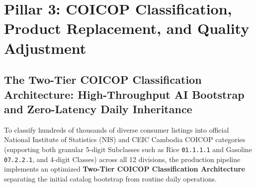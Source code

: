 \section{Pillar 3: COICOP Classification, Product Replacement, and Quality Adjustment}

\subsection{The Two-Tier COICOP Classification Architecture: High-Throughput AI Bootstrap and Zero-Latency Daily Inheritance}
\hs To classify hundreds of thousands of diverse consumer listings into official National Institute of Statistics (NIS) and CEIC Cambodia COICOP categories (supporting both granular 5-digit Subclasses such as Rice \texttt{01.1.1.1} and Gasoline \texttt{07.2.2.1}, and 4-digit Classes) across all 12 divisions, the production pipeline implements an optimized \textbf{Two-Tier COICOP Classification Architecture} separating the initial catalog bootstrap from routine daily operations.

